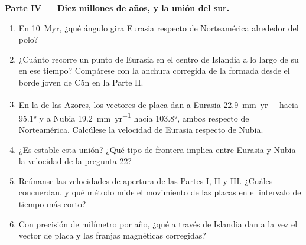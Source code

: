 \begin{problem}
\noindent\textbf{Parte IV --- Diez millones de años, y la unión del sur.}
\begin{enumerate}[resume]
  \item En \qty{10}{Myr}, ¿qué ángulo gira Eurasia respecto de Norteamérica alrededor del polo?
  \item ¿Cuánto recorre un punto de Eurasia en el centro de Islandia a lo largo de su  en ese tiempo? Compárese con la anchura
        corregida de la  formada desde el borde joven de C5n en la Parte II.
  \item En la  de las Azores, los vectores de placa dan a Eurasia \qty{22.9}{mm.yr^{-1}} hacia \ang{95.1} y a Nubia
        \qty{19.2}{mm.yr^{-1}} hacia \ang{103.8}, ambos respecto de Norteamérica. Calcúlese la velocidad de Eurasia respecto de Nubia.
  \item ¿Es estable esta unión? ¿Qué tipo de frontera implica entre Eurasia y Nubia la velocidad de la pregunta 22?
  \item Reúnanse las velocidades de apertura de las Partes I, II y III. ¿Cuáles concuerdan, y qué método mide el movimiento de las placas
        en el intervalo de tiempo más corto?
  \item Con precisión de milímetro por año, ¿qué  a través de Islandia dan a la vez el vector de placa y las
        franjas magnéticas corregidas?
\end{enumerate}
\end{problem}
